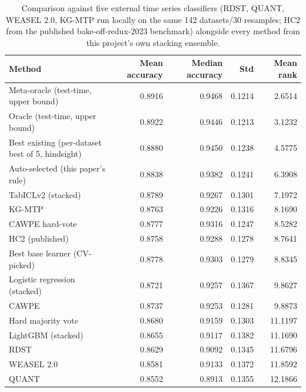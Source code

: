 \begin{table}[t]
\centering
\begin{tabular}{lrrrr}
\toprule
Method & Mean accuracy & Median accuracy & Std & Mean rank \\
\midrule
Meta-oracle (test-time, upper bound) & 0.8916 & 0.9468 & 0.1214 & 2.6514 \\
Oracle (test-time, upper bound) & 0.8922 & 0.9446 & 0.1213 & 3.1232 \\
Best existing (per-dataset best of 5, hindsight) & 0.8880 & 0.9450 & 0.1238 & 4.5775 \\
Auto-selected (this paper's rule) & 0.8838 & 0.9382 & 0.1241 & 6.3908 \\
TabICLv2 (stacked) & 0.8789 & 0.9267 & 0.1301 & 7.1972 \\
KG-MTP & 0.8763 & 0.9226 & 0.1316 & 8.1690 \\
CAWPE hard-vote & 0.8777 & 0.9316 & 0.1247 & 8.5282 \\
HC2 (published) & 0.8758 & 0.9288 & 0.1278 & 8.7641 \\
Best base learner (CV-picked) & 0.8778 & 0.9303 & 0.1279 & 8.8345 \\
Logistic regression (stacked) & 0.8721 & 0.9257 & 0.1367 & 9.8627 \\
CAWPE & 0.8737 & 0.9253 & 0.1281 & 9.8873 \\
Hard majority vote & 0.8680 & 0.9159 & 0.1303 & 11.1197 \\
LightGBM (stacked) & 0.8655 & 0.9117 & 0.1382 & 11.1690 \\
RDST & 0.8629 & 0.9092 & 0.1345 & 11.6796 \\
WEASEL 2.0 & 0.8581 & 0.9133 & 0.1372 & 11.8592 \\
QUANT & 0.8552 & 0.8913 & 0.1355 & 12.1866 \\
\bottomrule
\end{tabular}
\caption{Comparison against five external time series classifiers (RDST, QUANT, WEASEL 2.0, KG-MTP run locally on the same 142 datasets/30 resamples; HC2 from the published bake-off-redux-2023 benchmark) alongside every method from this project's own stacking ensemble.}
\label{tab:literature_comparison}
\end{table}